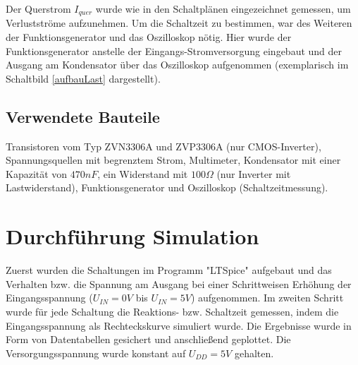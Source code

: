 \documentclass[11pt, a4paper]{article}
\begin{document}
Der Querstrom $I_{quer}$ wurde wie in den Schaltplänen eingezeichnet gemessen, um Verlustströme aufzunehmen.
Um die Schaltzeit zu bestimmen, war des Weiteren der Funktionsgenerator und das Oszilloskop nötig. Hier wurde der Funktionsgenerator anstelle der Eingangs-Stromversorgung eingebaut und der Ausgang am Kondensator über das Oszilloskop aufgenommen (exemplarisch im Schaltbild \autoref{aufbauLast} dargestellt).
\subsection*{Verwendete Bauteile}
Transistoren vom Typ ZVN3306A und ZVP3306A (nur CMOS-Inverter), Spannungsquellen mit begrenztem Strom, Multimeter, Kondensator mit einer Kapazität von $470 nF$, ein Widerstand mit $100 \Omega$ (nur Inverter mit Lastwiderstand), Funktionsgenerator und Oszilloskop (Schaltzeitmessung).
\section*{Durchführung Simulation}
Zuerst wurden die Schaltungen im Programm "LTSpice" aufgebaut und das Verhalten bzw. die Spannung am Ausgang bei einer Schrittweisen Erhöhung der Eingangsspannung ($U_{IN} = 0 V$ bis $U_{IN} = 5 V$) aufgenommen. Im zweiten Schritt wurde für jede Schaltung die Reaktions- bzw. Schaltzeit gemessen, indem die Eingangsspannung als Rechteckskurve simuliert wurde.
Die Ergebnisse wurde in Form von Datentabellen gesichert und anschließend geplottet. Die Versorgungsspannung wurde konstant auf $U_{DD} = 5 V$ gehalten.
\end{document}
